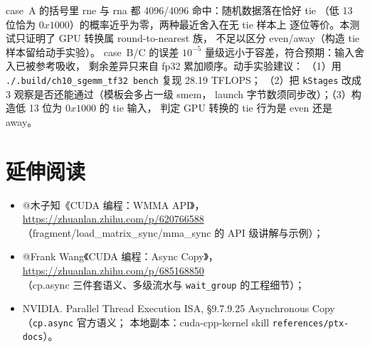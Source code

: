 case~A 的括号里 rne 与 rna 都 4096/4096 命中：随机数据落在恰好 tie
（低 13 位恰为 $0x1000$）的概率近乎为零，两种最近舍入在无 tie 样本上
逐位等价。本测试只证明了 GPU 转换属 round-to-nearest 族，
不足以区分 even/away（构造 tie 样本留给动手实验）。
case~B/C 的误差 $10^{-5}$ 量级远小于容差，符合预期：输入舍入已被参考吸收，
剩余差异只来自 fp32 累加顺序。动手实验建议：
（1）用 \texttt{.\allowbreak{}/\allowbreak{}.\allowbreak{}build/\allowbreak{}ch10\_\allowbreak{}sgemm\_\allowbreak{}tf32 bench} 复现 28.19 TFLOPS；
（2）把 \texttt{kStages} 改成 3 观察是否还能通过（模板会多占一级 smem，
launch 字节数须同步改）；（3）构造低 13 位为 $0x1000$ 的 tie 输入，
判定 GPU 转换的 tie 行为是 even 还是 away。

\section*{延伸阅读}

\begin{itemize}
  \item @木子知《CUDA 编程：WMMA API》，\\
        \url{https://zhuanlan.zhihu.com/p/620766588}\\
        （fragment/load\_matrix\_sync/mma\_sync 的 API 级讲解与示例）；
  \item @Frank Wang《CUDA 编程：Async Copy》，\\
        \url{https://zhuanlan.zhihu.com/p/685168850}\\
        （cp.async 三件套语义、多级流水与 \texttt{wait\_group} 的工程细节）；
  \item NVIDIA. Parallel Thread Execution ISA, §9.7.9.25
        Asynchronous Copy（\texttt{cp.async} 官方语义；
        本地副本：cuda-cpp-kernel skill \texttt{references/\allowbreak{}ptx-docs}）。
\end{itemize}
